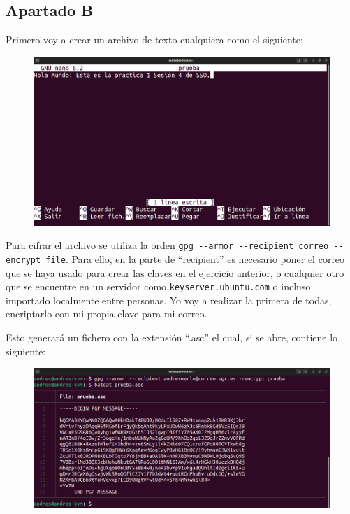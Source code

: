 \documentclass{article}
\begin{document}
\subsection*{Apartado B}

Primero voy a crear un archivo de texto cualquiera como el siguiente:

\begin{figure}[H]
    \includegraphics[width=\textwidth]{imagenes/Captura desde 2022-10-19 16-57-15.png}
\end{figure}

Para cifrar el archivo se utiliza la orden \verb|gpg --armor --recipient correo --encrypt file|. Para ello, en la parte de ``recipient'' es necesario poner el correo que se haya usado para crear las claves en el ejercicio anterior, o cualquier otro que se encuentre en un servidor como \verb|keyserver.ubuntu.com| o incluso importado localmente entre personas. Yo voy a realizar la primera de todas, encriptarlo con mi propia clave para mi correo.

\newpage

Esto generará un fichero con la extensión ``.asc'' el cual, si se abre, contiene lo siguiente:

\begin{figure}[H]
    \includegraphics[width=\textwidth]{imagenes/Portatil/Captura desde 2022-10-27 18-34-40.png}
\end{figure}
\end{document}
